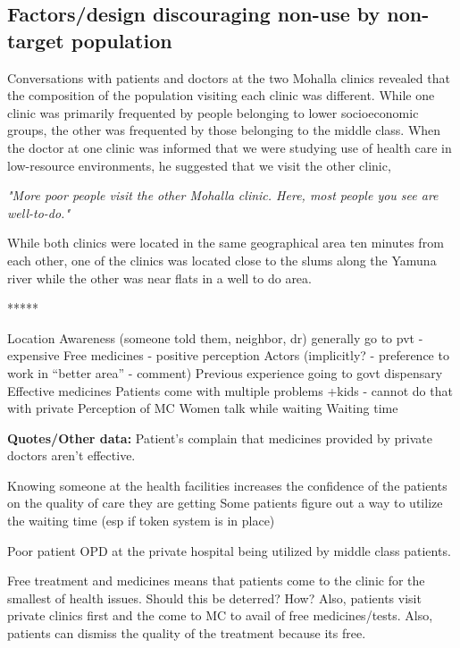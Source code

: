 \subsection{Factors/design discouraging non-use by non-target population}

Conversations with patients and doctors at the two Mohalla clinics revealed that the composition of the population visiting each clinic was different. While one clinic was primarily frequented by people belonging to lower socioeconomic groups, the other was frequented by those belonging to the middle class. When the doctor at one clinic was informed that we were studying use of health care in low-resource environments, he suggested that we visit the other clinic, 

\textit{"More poor people visit the other Mohalla clinic. Here, most people you see are well-to-do."} 

While both clinics were located in the same geographical area ten minutes from each other, one of the clinics was located close to the slums along the Yamuna river while the other was near flats in a well to do area. %



*****

Location
Awareness (someone told them, neighbor, dr)
generally go to pvt - expensive
Free medicines - positive perception
Actors (implicitly? - preference to work in “better area” - comment)
Previous experience going to govt dispensary
Effective medicines
Patients come with multiple problems +kids - cannot do that with private
Perception of MC
Women talk while waiting
Waiting time

\textbf{Quotes/Other data:}
Patient's complain that medicines provided by private doctors aren't effective. 

Knowing someone at the health facilities increases the confidence of the patients on the quality of care they are getting
Some patients figure out a way to utilize the waiting time (esp if token system is in place)

Poor patient OPD at the private hospital being utilized by middle class patients. 

Free treatment and medicines means that patients come to the clinic for the smallest of health issues. Should this be deterred? How? Also, patients visit private clinics first and the come to MC to avail of free medicines/tests. Also, patients can dismiss the quality of the treatment because its free. 

